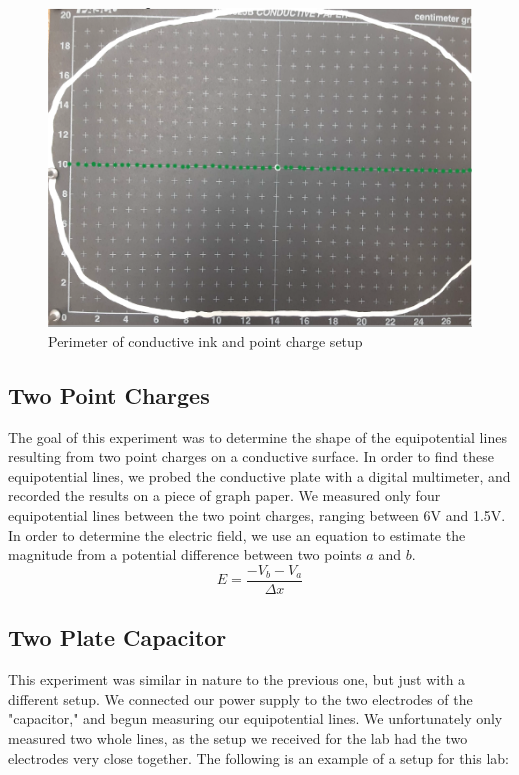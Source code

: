 \documentclass[titlepage]{article}
\begin{document}
    \FloatBarrier
    \begin{figure}[hbt!]
        \centering
        \caption{Perimeter of conductive ink and point charge setup}
        \includegraphics[scale=0.8]{procedure/part1}
    \end{figure} 
    \FloatBarrier



    

    \subsection{Two Point Charges}
    The goal of this experiment was to determine the shape of the equipotential lines resulting from two point charges on a conductive surface. In order to find these equipotential lines, we probed the conductive plate with a digital multimeter, and recorded the results on a piece of graph paper. We measured only four equipotential lines between the two point charges, ranging between 6V and 1.5V. In order to determine the electric field, we use an equation to estimate the magnitude from a potential difference between two points $a$ and $b$.
    $$E=\frac{-V_b-V_a}{\Delta x}$$



    \subsection{Two Plate Capacitor}
    This experiment was similar in nature to the previous one, but just with a different setup. We connected our power supply to the two electrodes of the "capacitor," and begun measuring our equipotential lines. We unfortunately only measured two whole lines, as the setup we received for the lab had the two electrodes very close together. The following is an example of a setup for this lab: 
\end{document}
